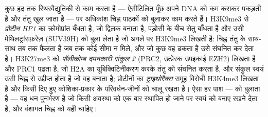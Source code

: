\begin{proposition}[चिह्न पढ़े जाते हैं, केवल महसूस नहीं होते]\label{prop:b3:chromatin-epigenetics:readers}
 कुछ हद तक स्थिरवैद्युतिकी से काम करता है --- ऐसीटिलित पूँछ
अपने DNA को कम कसकर पकड़ती है और तंतु खुल जाता है --- पर अधिकांश चिह्न
पाठकों को बुलाकर काम करते हैं। H3K9me3 से \emph{ प्रोटीन
HP1} का क्रोमोप्रांत बँधता है, जो द्विलक बनाता है, पड़ोसी
 के बीच सेतु बाँधता है और उसी मेथिलट्रांसफ़रेज़ (SUV39H)
को बुला लेता है जो अगले  पर H3K9me3 लिखती है: चिह्न तंतु
के साथ-साथ तब तक फैलता है जब तक कोई सीमा न मिले, और जो कुछ वह ढकता है
उसे संघनित कर देता है। H3K27me3 को \emph{पॉलीकोम्ब दमनकारी संकुल 2}
(PRC2, उत्प्रेरक उपइकाई EZH2) लिखता है और PRC1 पढ़ता है, जो H2A का
यूबिक्विटिनीकरण करके तंतु को संघनित करता है, और संकुल स्वयं उसी चिह्न
से उद्दीप्त होता है जो वह बनाता है; प्रोटीनों का \emph{ट्राइथोरैक्स}
समूह विरोधी H3K4me3 लिखता है और किसी दिए हुए कोशिका-प्रकार के
परिवर्धन-जीनों को चालू रखता है। ऐसा हर पाश ---   को बुलाता है
--- वह धन पुनर्भरण है जो किसी अवस्था को एक बार स्थापित हो जाने पर
स्वयं को बनाए रखने देता है, और वंशागत चिह्न को यही चाहिए।
\end{proposition}

